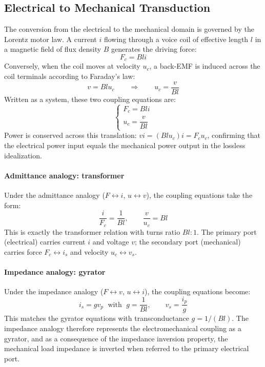 \subsection{Electrical to Mechanical Transduction}
\label{ssc:411}

The conversion from the electrical to the mechanical domain is governed by the Lorentz motor law. A current \(i\) flowing through a voice coil of effective length \(l\) in a magnetic field of flux density \(B\) generates the driving force:
\[
F_c = B l i
\]
Conversely, when the coil moves at velocity \(u_c\), a back-EMF is induced across the coil terminals according to Faraday's law:
\[
v = B l u_c \qquad \Longrightarrow \qquad u_c = \frac{v}{Bl}
\]
Written as a system, these two coupling equations are:
\[
\begin{cases}
    F_c = B l i \\[4pt]
    u_c = \dfrac{v}{B l}
\end{cases}
\]
Power is conserved across this translation: \(v i = (B l u_c) i = F_c u_c\), confirming that the electrical power input equals the mechanical power output in the lossless idealization.

\paragraph{Admittance analogy: transformer} Under the admittance analogy (\(F \leftrightarrow i\), \(u \leftrightarrow v\)), the coupling equations take the form:
\[
\frac{i}{F_c} = \frac{1}{Bl}, \qquad \frac{v}{u_c} = Bl
\]
This is exactly the transformer relation with turns ratio \(Bl\colon 1\). The primary port (electrical) carries current \(i\) and voltage \(v\); the secondary port (mechanical) carries force \(F_c \leftrightarrow i_s\) and velocity \(u_c \leftrightarrow v_s\).

\paragraph{Impedance analogy: gyrator} Under the impedance analogy (\(F \leftrightarrow v\), \(u \leftrightarrow i\)), the coupling equations become:
\[
i_s = g v_p \;\text{ with }\; g = \frac{1}{Bl}, \qquad v_s = \frac{i_p}{g}
\]
This matches the gyrator equations with transconductance \(g = 1/(Bl)\). The impedance analogy therefore represents the electromechanical coupling as a gyrator, and as a consequence of the impedance inversion property, the mechanical load impedance is inverted when referred to the primary electrical port.

